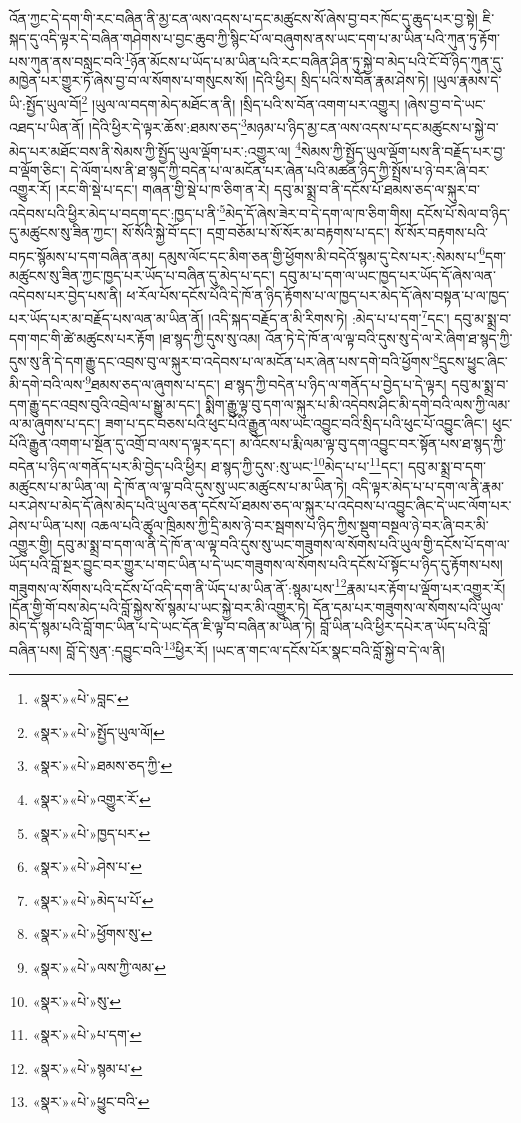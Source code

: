 འོན་ཀྱང་དེ་དག་གི་རང་བཞིན་ནི་མྱ་ངན་ལས་འདས་པ་དང་མཚུངས་སོ་ཞེས་བྱ་བར་ཁོང་དུ་ཆུད་པར་བྱ་སྟེ། ཇི་སྐད་དུ་འདི་ལྟར་དེ་བཞིན་གཤེགས་པ་བྱང་ཆུབ་ཀྱི་སྙིང་པོ་ལ་བཞུགས་ནས་ཡང་དག་པ་མ་ཡིན་པའི་ཀུན་ཏུ་རྟོག་པས་ཀུན་ནས་བསླང་བའི་\footnote{«སྣར་»«པེ་»བླང་}ཉོན་མོངས་པ་ཡོད་པ་མ་ཡིན་པའི་རང་བཞིན་ཤིན་ཏུ་སྐྱེ་བ་མེད་པའི་ངོ་བོ་ཉིད་ཀུན་དུ་མཁྱེན་པར་གྱུར་ཏོ་ཞེས་བྱ་བ་ལ་སོགས་པ་གསུངས་སོ། །དེའི་ཕྱིར། སྲིད་པའི་ས་བོན་རྣམ་ཤེས་ཏེ། །ཡུལ་རྣམས་དེ་ཡི་:སྤྱོད་ཡུལ་བོ།\footnote{«སྣར་»«པེ་»སྤྱོད་ཡུལ་ལོ།} །ཡུལ་ལ་བདག་མེད་མཐོང་ན་ནི། །སྲིད་པའི་ས་བོན་འགག་པར་འགྱུར། །ཞེས་བྱ་བ་དེ་ཡང་འཐད་པ་ཡིན་ནོ། །དེའི་ཕྱིར་དེ་ལྟར་ཆོས་:ཐམས་ཅད་\footnote{«སྣར་»«པེ་»ཐམས་ཅད་ཀྱི་}མཉམ་པ་ཉིད་མྱ་ངན་ལས་འདས་པ་དང་མཚུངས་པ་སྐྱེ་བ་མེད་པར་མཐོང་བས་ནི་སེམས་ཀྱི་སྤྱོད་ཡུལ་ལྡོག་པར་:འགྱུར་ལ། \footnote{«སྣར་»«པེ་»འགྱུར་རོ་}སེམས་ཀྱི་སྤྱོད་ཡུལ་ལྡོག་པས་ནི་བརྗོད་པར་བྱ་བ་ལྡོག་ཅིང་། དེ་ལོག་པས་ནི་ཐ་སྙད་ཀྱི་བདེན་པ་ལ་མངོན་པར་ཞེན་པའི་མཚན་ཉིད་ཀྱི་སྤྲོས་པ་ཉེ་བར་ཞི་བར་འགྱུར་རོ། །རང་གི་སྡེ་པ་དང་། གཞན་གྱི་སྡེ་པ་ཁ་ཅིག་ན་རེ། དབུ་མ་སྨྲ་བ་ནི་དངོས་པོ་ཐམས་ཅད་ལ་སྐུར་བ་འདེབས་པའི་ཕྱིར་མེད་པ་བདག་དང་:ཁྱད་པ་ནི་\footnote{«སྣར་»«པེ་»ཁྱད་པར་}མེད་དོ་ཞེས་ཟེར་བ་དེ་དག་ལ་ཁ་ཅིག་གིས། དངོས་པོ་སེལ་བ་ཉིད་དུ་མཚུངས་སུ་ཟིན་ཀྱང་། སོ་སོའི་སྐྱེ་བོ་དང་། དགྲ་བཅོམ་པ་སོ་སོར་མ་བརྟགས་པ་དང་། སོ་སོར་བརྟགས་པའི་བཏང་སྙོམས་པ་དག་བཞིན་ནམ། དམུས་ལོང་དང་མིག་ཅན་གྱི་ཕྱོགས་མི་བདེའོ་སྙམ་དུ་ངེས་པར་:སེམས་པ་\footnote{«སྣར་»«པེ་»ཤེས་པ་}དག་མཚུངས་སུ་ཟིན་ཀྱང་ཁྱད་པར་ཡོད་པ་བཞིན་དུ་མེད་པ་དང་། དབུ་མ་པ་དག་ལ་ཡང་ཁྱད་པར་ཡོད་དོ་ཞེས་ལན་འདེབས་པར་བྱེད་པས་ནི། ཕ་རོལ་པོས་དངོས་པོའི་དེ་ཁོ་ན་ཉིད་རྟོགས་པ་ལ་ཁྱད་པར་མེད་དོ་ཞེས་བསྟན་པ་ལ་ཁྱད་པར་ཡོད་པར་མ་བརྗོད་པས་ལན་མ་ཡིན་ནོ། །འདི་སྐད་བརྗོད་ན་མི་རིགས་ཏེ། :མེད་པ་པ་དག་\footnote{«སྣར་»«པེ་»མེད་པ་པོ་}དང་། དབུ་མ་སྨྲ་བ་དག་གང་གི་ཚེ་མཚུངས་པར་རྟོག །ཐ་སྙད་ཀྱི་དུས་སུ་འམ། འོན་ཏེ་དེ་ཁོ་ན་ལ་ལྟ་བའི་དུས་སུ་དེ་ལ་རེ་ཞིག་ཐ་སྙད་ཀྱི་དུས་སུ་ནི་དེ་དག་རྒྱུ་དང་འབྲས་བུ་ལ་སྐུར་བ་འདེབས་པ་ལ་མངོན་པར་ཞེན་པས་དགེ་བའི་ཕྱོགས་\footnote{«སྣར་»«པེ་»ཕྱོགས་སུ་}དྲུངས་ཕྱུང་ཞིང་མི་དགེ་བའི་ལས་\footnote{«སྣར་»«པེ་»ལས་ཀྱི་ལམ་}ཐམས་ཅད་ལ་ཞུགས་པ་དང་། ཐ་སྙད་ཀྱི་བདེན་པ་ཉིད་ལ་གནོད་པ་བྱེད་པ་དེ་ལྟར། དབུ་མ་སྨྲ་བ་དག་རྒྱུ་དང་འབྲས་བུའི་འབྲེལ་པ་སྒྱུ་མ་དང་། སྨིག་རྒྱུ་ལྟ་བུ་དག་ལ་སྐུར་པ་མི་འདེབས་ཤིང་མི་དགེ་བའི་ལས་ཀྱི་ལམ་ལ་མ་ཞུགས་པ་དང་། ཟག་པ་དང་བཅས་པའི་ཕུང་པོའི་རྒྱུན་ལས་ཡང་འབྱུང་བའི་སྲིད་པའི་ཕུང་པོ་འབྱུང་ཞིང་། ཕུང་པོའི་རྒྱུན་འགག་པ་སྔོན་དུ་འགྲོ་བ་ལས་ད་ལྟར་དང་། མ་འོངས་པ་རྨི་ལམ་ལྟ་བུ་དག་འབྱུང་བར་སྟོན་པས་ཐ་སྙད་ཀྱི་བདེན་པ་ཉིད་ལ་གནོད་པར་མི་བྱེད་པའི་ཕྱིར། ཐ་སྙད་ཀྱི་དུས་:སུ་ཡང་\footnote{«སྣར་»«པེ་»སུ་}མེད་པ་པ་\footnote{«སྣར་»«པེ་»པ་དག་}དང་། དབུ་མ་སྨྲ་བ་དག་མཚུངས་པ་མ་ཡིན་ལ། དེ་ཁོ་ན་ལ་ལྟ་བའི་དུས་སུ་ཡང་མཚུངས་པ་མ་ཡིན་ཏེ། འདི་ལྟར་མེད་པ་པ་དག་ལ་ནི་རྣམ་པར་ཤེས་པ་མེད་དོ་ཞེས་མེད་པའི་ཡུལ་ཅན་དངོས་པོ་ཐམས་ཅད་ལ་སྐུར་པ་འདེབས་པ་འབྱུང་ཞིང་དེ་ཡང་ལོག་པར་ཤེས་པ་ཡིན་པས། འཆལ་པའི་ཚུལ་ཁྲིམས་ཀྱི་དྲི་མས་ཉེ་བར་སྦགས་པ་ཉིད་ཀྱིས་སྡུག་བསྔལ་ཉེ་བར་ཞི་བར་མི་འགྱུར་གྱི། དབུ་མ་སྨྲ་བ་དག་ལ་ནི་དེ་ཁོ་ན་ལ་ལྟ་བའི་དུས་སུ་ཡང་གཟུགས་ལ་སོགས་པའི་ཡུལ་གྱི་དངོས་པོ་དག་ལ་ཡོད་པའི་བློ་སྔར་བྱུང་བར་གྱུར་པ་གང་ཡིན་པ་དེ་ཡང་གཟུགས་ལ་སོགས་པའི་དངོས་པོ་སྟོང་པ་ཉིད་དུ་རྟོགས་པས། གཟུགས་ལ་སོགས་པའི་དངོས་པོ་འདི་དག་ནི་ཡོད་པ་མ་ཡིན་ནོ་:སྙམ་པས་\footnote{«སྣར་»«པེ་»སྙམ་པ་}རྣམ་པར་རྟོག་པ་ལྡོག་པར་འགྱུར་རོ། །དོན་གྱི་གོ་བས་མེད་པའི་བློ་སྐྱེས་སོ་སྙམ་པ་ཡང་སྐྱེ་བར་མི་འགྱུར་ཏེ། དོན་དམ་པར་གཟུགས་ལ་སོགས་པའི་ཡུལ་མེད་དོ་སྙམ་པའི་བློ་གང་ཡིན་པ་དེ་ཡང་དོན་ཇི་ལྟ་བ་བཞིན་མ་ཡིན་ཏེ། བློ་ཡིན་པའི་ཕྱིར་དཔེར་ན་ཡོད་པའི་བློ་བཞིན་པས། བློ་དེ་སུན་:དབྱུང་བའི་\footnote{«སྣར་»«པེ་»ཕྱུང་བའི་}ཕྱིར་རོ། །ཡང་ན་གང་ལ་དངོས་པོར་སྣང་བའི་བློ་སྐྱེ་བ་དེ་ལ་ནི། 